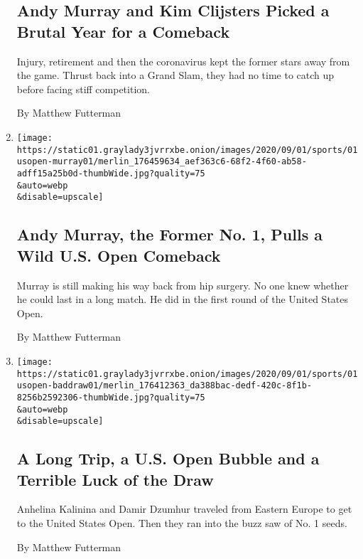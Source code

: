 \begin{enumerate}
{  \subsection{Andy Murray and Kim Clijsters Picked a Brutal Year for a
  Comeback}\label{andy-murray-and-kim-clijsters-picked-a-brutal-year-for-a-comeback}}

  Injury, retirement and then the coronavirus kept the former stars away
  from the game. Thrust back into a Grand Slam, they had no time to
  catch up before facing stiff competition.

  By Matthew Futterman
\item
  \href{/2020/09/01/sports/tennis/andy-murray-the-former-no-1-pulls-a-wild-us-open-comeback.html}{}

  \texttt{[image: https://static01.graylady3jvrrxbe.onion/images/2020/09/01/sports/01usopen-murray01/merlin\_176459634\_aef363c6-68f2-4f60-ab58-adff15a25b0d-thumbWide.jpg?quality=75\\\&auto=webp\\\&disable=upscale]}

  \hypertarget{andy-murray-the-former-no-1-pulls-a-wild-us-open-comeback}{%
  \subsection{Andy Murray, the Former No. 1, Pulls a Wild U.S. Open
  Comeback}\label{andy-murray-the-former-no-1-pulls-a-wild-us-open-comeback}}

  Murray is still making his way back from hip surgery. No one knew
  whether he could last in a long match. He did in the first round of
  the United States Open.

  By Matthew Futterman
\item
  \href{/2020/09/01/sports/tennis/us-open-draw-loss.html}{}

  \texttt{[image: https://static01.graylady3jvrrxbe.onion/images/2020/09/01/sports/01usopen-baddraw01/merlin\_176412363\_da388bac-dedf-420c-8f1b-8256b2592306-thumbWide.jpg?quality=75\\\&auto=webp\\\&disable=upscale]}

  \hypertarget{a-long-trip-a-us-open-bubble-and-a-terrible-luck-of-the-draw}{%
  \subsection{A Long Trip, a U.S. Open Bubble and a Terrible Luck of the
  Draw}\label{a-long-trip-a-us-open-bubble-and-a-terrible-luck-of-the-draw}}

  Anhelina Kalinina and Damir Dzumhur traveled from Eastern Europe to
  get to the United States Open. Then they ran into the buzz saw of No.
  1 seeds.

  By Matthew Futterman
\end{enumerate}

